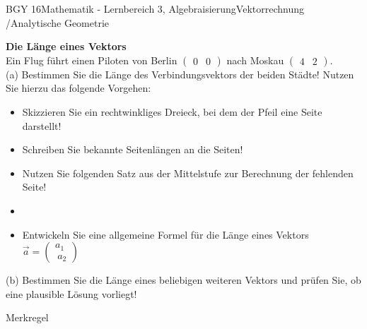 \documentclass[oneside,openany,headings=optiontotoc,11pt,numbers=noenddot]{scrreprt}
\begin{document}
\begin{worksheet}{BGY 16}{Mathematik - Lernbereich 3, Algebraisierung}{Vektorrechnung /Analytische Geometrie}
\begin{framed}
			\bigskip
			\color{black}
		\end{framed}
		\begin{framed}
			\noindent
			\textbf{Die Länge eines Vektors}\\
			Ein Flug führt einen Piloten von Berlin \(\begin{pmatrix}0 & 0\end{pmatrix}\) nach Moskau \(\begin{pmatrix}4 & 2\end{pmatrix}\).\\
			(a) Bestimmen Sie die Länge des Verbindungsvektors der beiden Städte! Nutzen Sie hierzu das folgende Vorgehen:
			\begin{framed}
					\begin{itemize}
						\item Skizzieren Sie ein rechtwinkliges Dreieck, bei dem der Pfeil eine Seite darstellt!
						\item Schreiben Sie bekannte Seitenlängen an die Seiten!
						\item Nutzen Sie folgenden Satz aus der Mittelstufe zur Berechnung der fehlenden Seite!
						\item[]
						\item Entwickeln Sie eine allgemeine Formel für die Länge eines Vektors \(\overrightarrow{a} = \begin{pmatrix}
						a_{1} \\\ a_{2}
						\end{pmatrix}\)
					\end{itemize}
			\end{framed}
			\noindent
			(b) Bestimmen Sie die Länge eines beliebigen weiteren Vektors und prüfen Sie, ob eine plausible Lösung vorliegt!
		\end{framed}
		\begin{framed}
			\color{codegray}\tiny Merkregel
			\par
			\bigskip
			\color{black}
		\end{framed}
	\end{worksheet}
\end{document}
